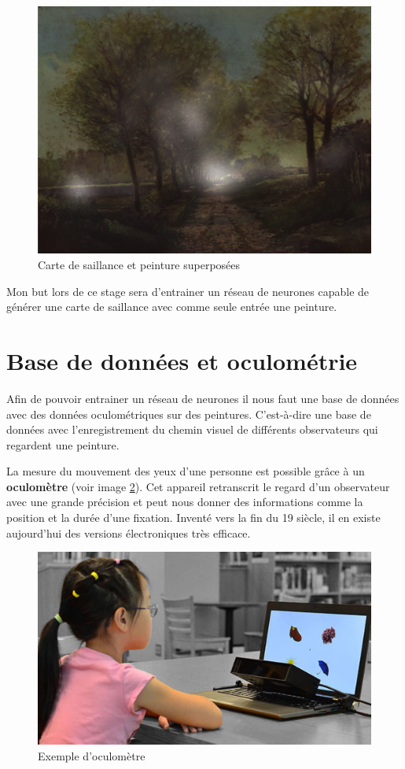 \begin{figure}[!ht]
    \centering
    \includegraphics[width=0.7\linewidth]{datas/exemple_saliency_map_transparency.png}
    \caption{Carte de saillance et peinture superposées}
    \label{saliency_map_transparency}
\end{figure}

\par
Mon but lors de ce stage sera d'entrainer un réseau de neurones capable de générer une carte de saillance avec comme seule entrée une peinture. 

\section{Base de données et oculométrie}
\label{database}
\par
Afin de pouvoir entrainer un réseau de neurones il nous faut une base de données avec des données oculométriques sur des peintures. C'est-à-dire une base de données avec l'enregistrement du chemin visuel de différents observateurs qui regardent une peinture.

\par
La mesure du mouvement des yeux d'une personne est possible grâce à un \textbf{oculomètre} (voir image \ref{oculo}). Cet appareil retranscrit le regard d'un observateur avec une grande précision et peut nous donner des informations comme la position et la durée d'une fixation. Inventé vers la fin du 19 siècle, il en existe aujourd'hui des versions électroniques très efficace.

\begin{figure}[!ht]
    \centering
    \includegraphics[width=0.7\linewidth]{datas/oculometre.jpg}
    \caption{Exemple d'oculomètre}
    \label{oculo}
\end{figure}

